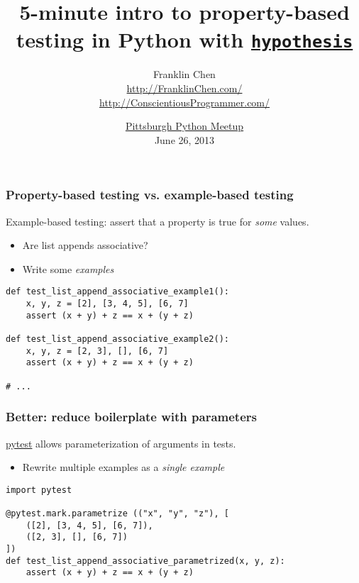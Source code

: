 \usepackage{minted}

\title{5-minute intro to property-based testing in Python with \href{https://github.com/DRMacIver/hypothesis}{\texttt{hypothesis}}}
\author{Franklin Chen \\ \url{http://FranklinChen.com/} \\ \url{http://ConscientiousProgrammer.com/}}
\date{\href{http://www.meetup.com/pghpython/events/120442102}{Pittsburgh Python Meetup} \\
June 26, 2013
}



\begin{frame}
  \titlepage
\end{frame}


\begin{frame}[fragile]
  \frametitle{Property-based testing vs. example-based testing}
  
  Example-based testing: assert that a property is true for \emph{some} values.
  \begin{itemize}  
  \item Are list appends associative?
  \item Write some \emph{examples}
  \end{itemize}

  \begin{verbatim}
def test_list_append_associative_example1():
    x, y, z = [2], [3, 4, 5], [6, 7]
    assert (x + y) + z == x + (y + z)

def test_list_append_associative_example2():
    x, y, z = [2, 3], [], [6, 7]
    assert (x + y) + z == x + (y + z)

# ...
  \end{verbatim}    
\end{frame}

\begin{frame}[fragile]
  \frametitle{Better: reduce boilerplate with parameters}

  \href{http://pytest.org/}{pytest} allows parameterization of arguments in tests.
  \begin{itemize}
  \item Rewrite multiple examples as a \emph{single example}
  \end{itemize}

  \begin{verbatim}
import pytest

@pytest.mark.parametrize (("x", "y", "z"), [
    ([2], [3, 4, 5], [6, 7]),
    ([2, 3], [], [6, 7])
])
def test_list_append_associative_parametrized(x, y, z):
    assert (x + y) + z == x + (y + z)
  \end{verbatim}
\end{frame}

